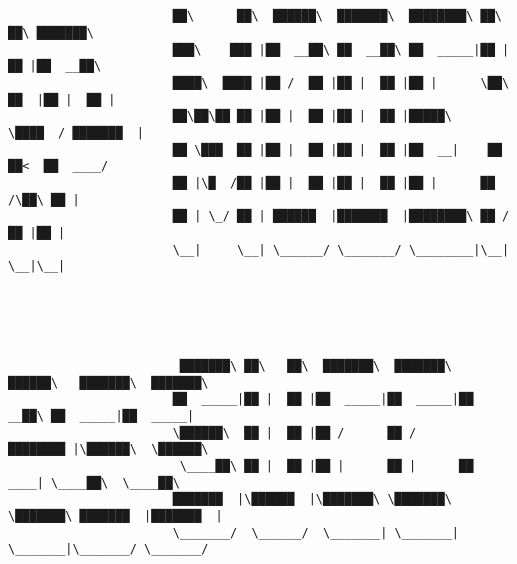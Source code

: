 \documentclass[varwidth=\maxdimen,margin=0.5cm,multi={verbatim}]{standalone}
\begin{document}
\begin{verbatim}

                       
                       ██\      ██\  ██████\  ███████\  ████████\ ██\   ██\ ███████\         
                       ███\    ███ |██  __██\ ██  __██\ ██  _____|██ |  ██ |██  __██\        
                       ████\  ████ |██ /  ██ |██ |  ██ |██ |      \██\ ██  |██ |  ██ |       
                       ██\██\██ ██ |██ |  ██ |██ |  ██ |█████\     \████  / ███████  |       
                       ██ \███  ██ |██ |  ██ |██ |  ██ |██  __|    ██  ██<  ██  ____/        
                       ██ |\█  /██ |██ |  ██ |██ |  ██ |██ |      ██  /\██\ ██ |             
                       ██ | \_/ ██ | ██████  |███████  |████████\ ██ /  ██ |██ |             
                       \__|     \__| \______/ \_______/ \________|\__|  \__|\__|             
                                                                                             
                                                                                             
                                                                                             
                                                                                             
                                                                                             
                        ███████\ ██\   ██\  ███████\  ███████\  ██████\   ███████\  ███████\ 
                       ██  _____|██ |  ██ |██  _____|██  _____|██  __██\ ██  _____|██  _____|
                       \██████\  ██ |  ██ |██ /      ██ /      ████████ |\██████\  \██████\  
                        \____██\ ██ |  ██ |██ |      ██ |      ██   ____| \____██\  \____██\ 
                       ███████  |\██████  |\███████\ \███████\ \███████\ ███████  |███████  |
                       \_______/  \______/  \_______| \_______| \_______|\_______/ \_______/
                       


\end{verbatim}
\end{document}
